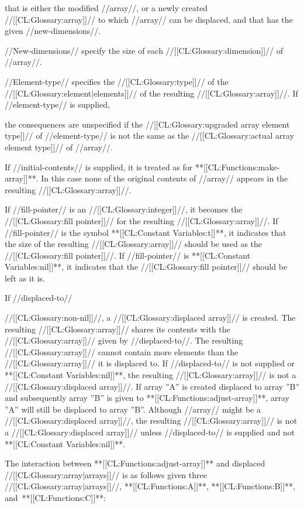 that is either the modified //array//, or a newly created //[[CL:Glossary:array]]// to which //array// can be displaced, and that has the given //new-dimensions//.

//New-dimensions// specify the size of each //[[CL:Glossary:dimension]]// of //array//.

//Element-type// specifies the //[[CL:Glossary:type]]// of the //[[CL:Glossary:element|elements]]// of the resulting //[[CL:Glossary:array]]//. If //element-type// is supplied,

the consequences are unspecified if the //[[CL:Glossary:upgraded array element type]]// of //element-type// is not the same as the //[[CL:Glossary:actual array element type]]// of //array//.

If //initial-contents// is supplied, it is treated as for **[[CL:Functions:make-array]]**. In this case none of the original contents of //array// appears in the resulting //[[CL:Glossary:array]]//.

If //fill-pointer// is an //[[CL:Glossary:integer]]//, it becomes the //[[CL:Glossary:fill pointer]]// for the resulting //[[CL:Glossary:array]]//. If //fill-pointer// is the symbol **[[CL:Constant Variables:t]]**, it indicates that the size of the resulting //[[CL:Glossary:array]]// should be used as the //[[CL:Glossary:fill pointer]]//. If //fill-pointer// is **[[CL:Constant Variables:nil]]**, it indicates that the //[[CL:Glossary:fill pointer]]// should be left as it is.

If //displaced-to//

//[[CL:Glossary:non-nil]]//, a //[[CL:Glossary:displaced array]]// is created. The resulting //[[CL:Glossary:array]]// shares its contents with the //[[CL:Glossary:array]]// given by //displaced-to//. The resulting //[[CL:Glossary:array]]// cannot contain more elements than the //[[CL:Glossary:array]]// it is displaced to. If //displaced-to// is not supplied or **[[CL:Constant Variables:nil]]**, the resulting //[[CL:Glossary:array]]// is not a //[[CL:Glossary:displaced array]]//. If array ''A'' is created displaced to array ''B'' and subsequently array ''B'' is given to **[[CL:Functions:adjust-array]]**, array ''A'' will still be displaced to array ''B''. Although //array// might be a //[[CL:Glossary:displaced array]]//, the resulting //[[CL:Glossary:array]]// is not a //[[CL:Glossary:displaced array]]// unless //displaced-to// is supplied and not **[[CL:Constant Variables:nil]]**.

The interaction between **[[CL:Functions:adjust-array]]** and displaced //[[CL:Glossary:array|arrays]]// is as follows given three //[[CL:Glossary:array|arrays]]//, **[[CL:Functions:A]]**, **[[CL:Functions:B]]**, and~**[[CL:Functions:C]]**:



